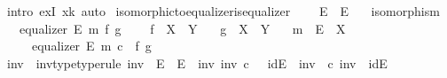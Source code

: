 \begin{isabellebody}
\ {\isacharparenleft}{\kern0pt}intro\ exI{\isacharbrackleft}{\kern0pt}\ x{\isacharequal}{\kern0pt}k{\isacharprime}{\kern0pt}{\isacharbrackright}{\kern0pt}{\isacharcomma}{\kern0pt}\ auto{\isacharparenright}{\kern0pt}\isanewline
{}\isamarkupfalse%
%
\endisatagproof
{\isafoldproof}%
%
\isadelimproof
\isanewline
%
\endisadelimproof
\isanewline
{}\isamarkupfalse%
\ isomorphic{\isacharunderscore}{\kern0pt}to{\isacharunderscore}{\kern0pt}equalizer{\isacharunderscore}{\kern0pt}is{\isacharunderscore}{\kern0pt}equalizer{\isacharcolon}{\kern0pt}\isanewline
\ \ \ {\isachardoublequoteopen}{\isasymphi}{\isacharcolon}{\kern0pt}\ E{\isacharprime}{\kern0pt}\ {\isasymrightarrow}\ E{\isachardoublequoteclose}\isanewline
\ \ \ {\isachardoublequoteopen}isomorphism\ {\isasymphi}{\isachardoublequoteclose}\isanewline
\ \ \ {\isachardoublequoteopen}equalizer\ E\ m\ f\ g{\isachardoublequoteclose}\ \isanewline
\ \ \ {\isachardoublequoteopen}f\ {\isacharcolon}{\kern0pt}\ X\ {\isasymrightarrow}\ Y{\isachardoublequoteclose}\isanewline
\ \ \ {\isachardoublequoteopen}g\ {\isacharcolon}{\kern0pt}\ X\ {\isasymrightarrow}\ Y{\isachardoublequoteclose}\isanewline
\ \ \ {\isachardoublequoteopen}m\ {\isacharcolon}{\kern0pt}\ E\ {\isasymrightarrow}\ X{\isachardoublequoteclose}\isanewline
\ \ \ \ \ {\isachardoublequoteopen}equalizer\ E{\isacharprime}{\kern0pt}\ {\isacharparenleft}{\kern0pt}m\ {\isasymcirc}\isactrlsub c\ {\isasymphi}{\isacharparenright}{\kern0pt}\ f\ g{\isachardoublequoteclose}\isanewline
%
\isadelimproof
%
\endisadelimproof
%
\isatagproof
{}\isamarkupfalse%
\ {\isacharminus}{\kern0pt}\ \isanewline
\ \ \isamarkupfalse%
\ {\isasymphi}{\isacharunderscore}{\kern0pt}inv\ \ {\isasymphi}{\isacharunderscore}{\kern0pt}inv{\isacharunderscore}{\kern0pt}type{\isacharbrackleft}{\kern0pt}type{\isacharunderscore}{\kern0pt}rule{\isacharbrackright}{\kern0pt}{\isacharcolon}{\kern0pt}\ {\isachardoublequoteopen}{\isasymphi}{\isacharunderscore}{\kern0pt}inv\ {\isacharcolon}{\kern0pt}\ E\ {\isasymrightarrow}\ E{\isacharprime}{\kern0pt}{\isachardoublequoteclose}\ \ {\isasymphi}{\isacharunderscore}{\kern0pt}inv{\isacharunderscore}{\kern0pt}{\isasymphi}{\isacharcolon}{\kern0pt}\ {\isachardoublequoteopen}{\isasymphi}{\isacharunderscore}{\kern0pt}inv\ {\isasymcirc}\isactrlsub c\ {\isasymphi}\ {\isacharequal}{\kern0pt}\ id{\isacharparenleft}{\kern0pt}E{\isacharprime}{\kern0pt}{\isacharparenright}{\kern0pt}{\isachardoublequoteclose}\ \ {\isasymphi}{\isasymphi}{\isacharunderscore}{\kern0pt}inv{\isacharcolon}{\kern0pt}\ {\isachardoublequoteopen}{\isasymphi}\ {\isasymcirc}\isactrlsub c\ {\isasymphi}{\isacharunderscore}{\kern0pt}inv\ {\isacharequal}{\kern0pt}\ id{\isacharparenleft}{\kern0pt}E{\isacharparenright}{\kern0pt}{\isachardoublequoteclose}\isanewline

\end{isabellebody}
